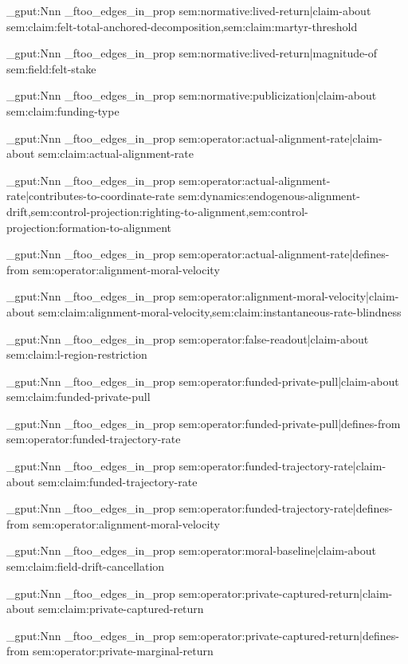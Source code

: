 \prop_gput:Nnn \g_ftoo_edges_in_prop { sem:normative:lived-return|claim-about } { sem:claim:felt-total-anchored-decomposition,sem:claim:martyr-threshold }

\prop_gput:Nnn \g_ftoo_edges_in_prop { sem:normative:lived-return|magnitude-of } { sem:field:felt-stake }

\prop_gput:Nnn \g_ftoo_edges_in_prop { sem:normative:publicization|claim-about } { sem:claim:funding-type }

\prop_gput:Nnn \g_ftoo_edges_in_prop { sem:operator:actual-alignment-rate|claim-about } { sem:claim:actual-alignment-rate }

\prop_gput:Nnn \g_ftoo_edges_in_prop { sem:operator:actual-alignment-rate|contributes-to-coordinate-rate } { sem:dynamics:endogenous-alignment-drift,sem:control-projection:righting-to-alignment,sem:control-projection:formation-to-alignment }

\prop_gput:Nnn \g_ftoo_edges_in_prop { sem:operator:actual-alignment-rate|defines-from } { sem:operator:alignment-moral-velocity }

\prop_gput:Nnn \g_ftoo_edges_in_prop { sem:operator:alignment-moral-velocity|claim-about } { sem:claim:alignment-moral-velocity,sem:claim:instantaneous-rate-blindness }

\prop_gput:Nnn \g_ftoo_edges_in_prop { sem:operator:false-readout|claim-about } { sem:claim:l-region-restriction }

\prop_gput:Nnn \g_ftoo_edges_in_prop { sem:operator:funded-private-pull|claim-about } { sem:claim:funded-private-pull }

\prop_gput:Nnn \g_ftoo_edges_in_prop { sem:operator:funded-private-pull|defines-from } { sem:operator:funded-trajectory-rate }

\prop_gput:Nnn \g_ftoo_edges_in_prop { sem:operator:funded-trajectory-rate|claim-about } { sem:claim:funded-trajectory-rate }

\prop_gput:Nnn \g_ftoo_edges_in_prop { sem:operator:funded-trajectory-rate|defines-from } { sem:operator:alignment-moral-velocity }

\prop_gput:Nnn \g_ftoo_edges_in_prop { sem:operator:moral-baseline|claim-about } { sem:claim:field-drift-cancellation }

\prop_gput:Nnn \g_ftoo_edges_in_prop { sem:operator:private-captured-return|claim-about } { sem:claim:private-captured-return }

\prop_gput:Nnn \g_ftoo_edges_in_prop { sem:operator:private-captured-return|defines-from } { sem:operator:private-marginal-return }

